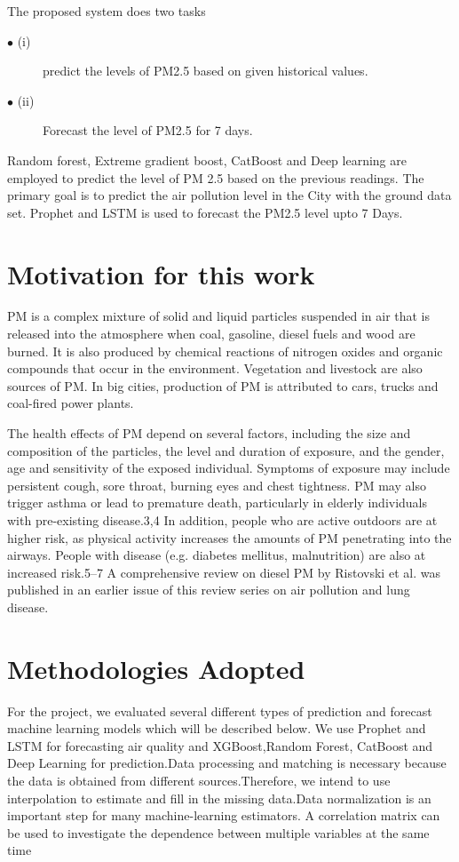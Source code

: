 The proposed system does two tasks
\begin{description}
  \item[$\bullet$ (i)]  predict the levels of PM2.5 based on given historical values.
  \item[$\bullet$ (ii)]   Forecast the level of PM2.5 for 7 days.
\end{description}
Random forest, Extreme gradient boost, CatBoost
and Deep learning are employed to predict the
level of PM 2.5 based on the previous readings.
The primary goal is to predict the air pollution
level in the City with the ground data set.
Prophet and LSTM is used to forecast the PM2.5 level upto 7 Days.


\section{Motivation for this work}

PM is a complex mixture of solid and liquid particles suspended in air that is released into the atmosphere when coal, gasoline, diesel fuels and wood are burned. It is also produced by chemical reactions of nitrogen oxides and organic compounds that occur in the environment. Vegetation and livestock are also sources of PM. In big cities, production of PM is attributed to cars, trucks and coal-fired power plants.

The health effects of PM depend on several factors, including the size and composition of the particles, the level and duration of exposure, and the gender, age and sensitivity of the exposed individual. Symptoms of exposure may include persistent cough, sore throat, burning eyes and chest tightness. PM may also trigger asthma or lead to premature death, particularly in elderly individuals with pre-existing disease.3,4 In addition, people who are active outdoors are at higher risk, as physical activity increases the amounts of PM penetrating into the airways. People with disease (e.g. diabetes mellitus, malnutrition) are also at increased risk.5–7 A comprehensive review on diesel PM by Ristovski et al. was published in an earlier issue of this review series on air pollution and lung disease.\\

\pagebreak
\section{Methodologies Adopted}
For the project, we evaluated several different types of prediction and forecast machine learning  models which will be described below. We use Prophet and LSTM for forecasting air quality and XGBoost,Random Forest, CatBoost and Deep Learning for prediction.Data processing and matching is necessary because the data is obtained from diﬀerent sources.Therefore, we intend to use interpolation to estimate and ﬁll in the missing data.Data normalization is an important step for many machine-learning estimators. A correlation matrix can be used to investigate the dependence between multiple variables at the same time



